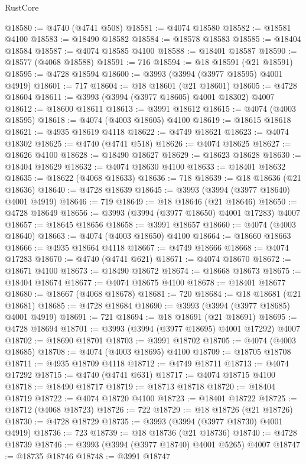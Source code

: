 \begin{lexlean}{RustCore}
\begin{coremodule}
@18580 := @4740 (@4741 @508)
@18581 := @4074 @18580
@18582 := @18581 @4100
@18583 := @18490 @18582
@18584 := @18578 @18583
@18585 := @18404 @18584
@18587 := @4074 @18585 @4100
@18588 := @18401 @18587
@18590 := @18577 (@4068 @18588)
@18591 := 716
@18594 := @18 @18591 (@21 @18591)
@18595 := @4728 @18594
@18600 := @3993 (@3994 (@3977 @18595) @4001 @4919)
@18601 := 717
@18604 := @18 @18601 (@21 @18601)
@18605 := @4728 @18604
@18611 := @3993 (@3994 (@3977 @18605) @4001 @18302) @4007
@18612 := @18600 @18611
@18613 := @3991 @18612
@18615 := @4074 (@4003 @18595)
@18618 := @4074 (@4003 @18605) @4100
@18619 := @18615 @18618
@18621 := @4935 @18619 @4118
@18622 := @4749 @18621
@18623 := @4074 @18302
@18625 := @4740 (@4741 @518)
@18626 := @4074 @18625
@18627 := @18626 @4100
@18628 := @18490 @18627
@18629 := @18623 @18628
@18630 := @18404 @18629
@18632 := @4074 @18630 @4100
@18633 := @18401 @18632
@18635 := @18622 (@4068 @18633)
@18636 := 718
@18639 := @18 @18636 (@21 @18636)
@18640 := @4728 @18639
@18645 := @3993 (@3994 (@3977 @18640) @4001 @4919)
@18646 := 719
@18649 := @18 @18646 (@21 @18646)
@18650 := @4728 @18649
@18656 := @3993 (@3994 (@3977 @18650) @4001 @17283) @4007
@18657 := @18645 @18656
@18658 := @3991 @18657
@18660 := @4074 (@4003 @18640)
@18663 := @4074 (@4003 @18650) @4100
@18664 := @18660 @18663
@18666 := @4935 @18664 @4118
@18667 := @4749 @18666
@18668 := @4074 @17283
@18670 := @4740 (@4741 @621)
@18671 := @4074 @18670
@18672 := @18671 @4100
@18673 := @18490 @18672
@18674 := @18668 @18673
@18675 := @18404 @18674
@18677 := @4074 @18675 @4100
@18678 := @18401 @18677
@18680 := @18667 (@4068 @18678)
@18681 := 720
@18684 := @18 @18681 (@21 @18681)
@18685 := @4728 @18684
@18690 := @3993 (@3994 (@3977 @18685) @4001 @4919)
@18691 := 721
@18694 := @18 @18691 (@21 @18691)
@18695 := @4728 @18694
@18701 := @3993 (@3994 (@3977 @18695) @4001 @17292) @4007
@18702 := @18690 @18701
@18703 := @3991 @18702
@18705 := @4074 (@4003 @18685)
@18708 := @4074 (@4003 @18695) @4100
@18709 := @18705 @18708
@18711 := @4935 @18709 @4118
@18712 := @4749 @18711
@18713 := @4074 @17292
@18715 := @4740 (@4741 @631)
@18717 := @4074 @18715 @4100
@18718 := @18490 @18717
@18719 := @18713 @18718
@18720 := @18404 @18719
@18722 := @4074 @18720 @4100
@18723 := @18401 @18722
@18725 := @18712 (@4068 @18723)
@18726 := 722
@18729 := @18 @18726 (@21 @18726)
@18730 := @4728 @18729
@18735 := @3993 (@3994 (@3977 @18730) @4001 @4919)
@18736 := 723
@18739 := @18 @18736 (@21 @18736)
@18740 := @4728 @18739
@18746 := @3993 (@3994 (@3977 @18740) @4001 @5265) @4007
@18747 := @18735 @18746
@18748 := @3991 @18747

\end{coremodule}
\end{lexlean}

